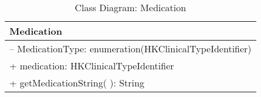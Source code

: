 \begin{table}[H]
\centering
\caption{Class Diagram: Medication}

\hspace{1em}
\renewcommand{\arraystretch}{1.7}

\begin{tabular}{|l|}
\hline
\textbf{Medication} \\
\hline
– MedicationType: enumeration(HKClinicalTypeIdentifier) \\
+ medication: HKClinicalTypeIdentifier \\
\hdashline
+ getMedicationString( ): String \\
\hline
\end{tabular}
\end{table}
